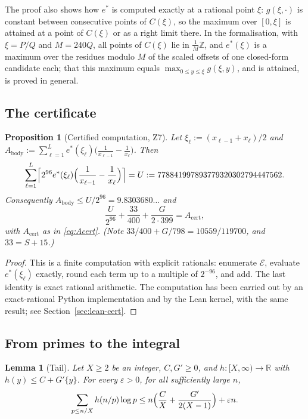 \documentclass[11pt]{amsart}
\newtheorem{proposition}[theorem]{Proposition}
\newtheorem{lemma}[theorem]{Lemma}
\theoremstyle{definition}
\theoremstyle{remark}
\numberwithin{equation}{section}
\newcommand{\ZZ}{\mathbb{Z}}
\newcommand{\RR}{\mathbb{R}}
\newcommand{\cE}{\mathcal{E}}
\newcommand{\Acert}{A_{\mathrm{cert}}}
\newcommand{\Abody}{A_{\mathrm{body}}}
\newcommand{\eps}{\varepsilon}
\begin{document}
The proof also shows how $e^*$ is computed exactly at a rational point $\xi$: $g(\xi,\cdot)$ is constant between
consecutive points of $C(\xi)$, so the maximum over $[0,\xi]$ is attained at a point of $C(\xi)$ or as a right
limit there. In the formalisation, with $\xi=P/Q$ and $M=240Q$, all points of $C(\xi)$ lie in $\frac1M\ZZ$, and
$e^*(\xi)$ is a maximum over the residues modulo $M$ of the scaled offsets of one closed-form candidate each; that
this maximum equals $\max_{0\le y\le\xi}g(\xi,y)$, and is attained, is proved in general.

\subsection{The certificate}

\begin{proposition}[Certified computation, Z7]\label{prop:certA}
Let $\xi_\ell:=(x_{\ell-1}+x_\ell)/2$ and $\Abody:=\sum_{\ell=1}^{L}e^*(\xi_\ell)\bigl(\frac1{x_{\ell-1}}-\frac1{x_\ell}\bigr)$.
Then
\[
  \sum_{\ell=1}^{L}\Bigl\lceil 2^{96}e^*(\xi_\ell)\Bigl(\frac1{x_{\ell-1}}-\frac1{x_\ell}\Bigr)\Bigr\rceil
  =U:=778841997893779320302794447562 .
\]
Consequently $\Abody\le U/2^{96}=9.8303680\ldots$ and
\[
  \frac{U}{2^{96}}+\frac{33}{400}+\frac{G}{2\cdot 399}=\Acert ,
\]
with $\Acert$ as in \eqref{eq:Acert}. (Note $33/400+G/798=10559/119700$, and $33=S+15$.)
\end{proposition}

\begin{proof}
This is a finite computation with explicit rationals: enumerate $\cE$, evaluate $e^*(\xi_\ell)$ exactly, round each
term up to a multiple of $2^{-96}$, and add. The last identity is exact rational arithmetic. The computation has
been carried out by an exact-rational Python implementation and by the Lean kernel, with the same result; see
Section~\ref{sec:lean-cert}.
\end{proof}

\subsection{From primes to the integral}

\begin{lemma}[Tail]\label{lem:pnt-tail}
Let $X\ge2$ be an integer, $C,G'\ge0$, and $h:[X,\infty)\to\RR$ with $h(y)\le C+G'\{y\}$. For every
$\eps>0$, for all sufficiently large $n$,
\[
  \sum_{p\le n/X}h(n/p)\log p\le n\Bigl(\frac CX+\frac{G'}{2(X-1)}\Bigr)+\eps n .
\]
\end{lemma}
\end{document}

